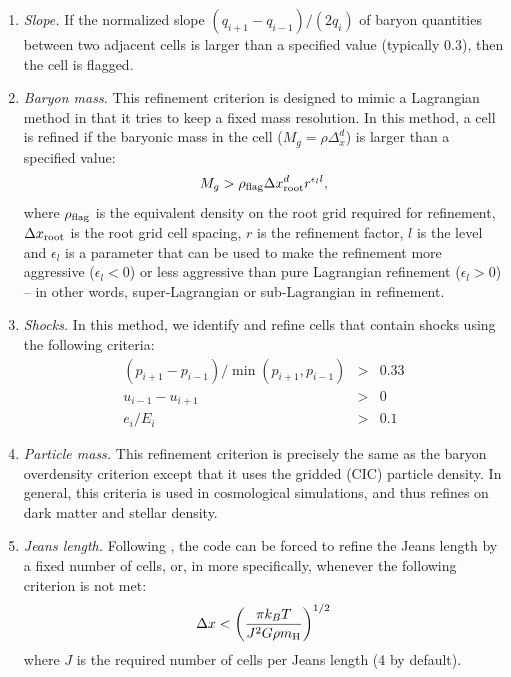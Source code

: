 \begin{enumerate}

\item{\em Slope.}  If the normalized slope $(q_{i+1} - q_{i-1})/ (2 q_i)$ of baryon quantities between two adjacent cells is larger than a specified value (typically 0.3), then the cell is flagged.

\item{\em Baryon mass.}  This refinement criterion is designed to mimic a Lagrangian method in that it tries to keep a fixed mass resolution.  In this method, a cell is refined if the baryonic mass in the cell ($M_g = \rho \Delta_x^d$) is larger than a specified value:
\begin{equation}
M_g > \rho_{\rm flag} {\Delta x^d_{\rm root}} r^{\epsilon_l l},
\end{equation}
where $\rho_{\rm flag}$ is the equivalent density on the root grid required for refinement, $\Delta x_{\rm root}$ is the root grid cell spacing, $r$ is the refinement factor, $l$ is the level and $\epsilon_l$ is a parameter that can be used to make the refinement more aggressive ($\epsilon_l < 0$) or less aggressive than pure Lagrangian refinement ($\epsilon_l > 0$) -- in other words, super-Lagrangian or sub-Lagrangian in refinement.

\item{\em Shocks.}  In this method, we identify and refine cells that contain shocks using the following criteria:
\begin{eqnarray}
(p_{i+1} - p_{i-1})/\min(p_{i+1}, p_{i-1}) & > & 0.33  \nonumber \\
u_{i-1} - u_{i+1} & > & 0 \\
e_i / E_i & > & 0.1  \nonumber
\end{eqnarray}

\item{\em Particle mass.}  This refinement criterion is precisely the same as the baryon overdensity criterion except that it uses the gridded (CIC) particle density.  In general, this criteria is used in cosmological simulations, and thus refines on dark matter and stellar density.

\item{\em Jeans length.}  Following \cite{Truelove98}, the code can be forced to refine the Jeans length by a fixed number of cells, or, in more specifically, whenever the following criterion is not met:
\begin{equation}
\Delta x < \left( \frac{\pi k_B T}{J^2 G \rho \mh} \right)^{1/2}
\end{equation}
where $J$ is the required number of cells per Jeans length (4 by default).


\end{enumerate}
